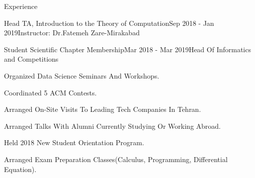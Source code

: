 \documentclass{resume} %
\begin{document}
\begin{rSection}{Experience}
\begin{rSubsection}{Head TA, Introduction to the Theory of Computation}{Sep 2018 - Jan 2019}{Instructor: Dr.Fatemeh Zare-Mirakabad}{ }
		\end{rSubsection}
		
		
		\begin{rSubsection}{Student Scientific Chapter Membership}{Mar 2018 - Mar  2019}{Head Of Informatics and Competitions}{ }
			\item Organized Data Science Seminars And Workshops.
			\item Coordinated 5 ACM Contests.
			\item Arranged On-Site Visits To Leading Tech Companies In Tehran.
			\item Arranged Talks With Alumni Currently Studying Or Working Abroad.
			\item Held 2018 New Student Orientation Program.
			\item Arranged Exam Preparation Classes(Calculus, Programming, Differential Equation).
		\end{rSubsection}
		
		
	\end{rSection}
	
\end{document}
